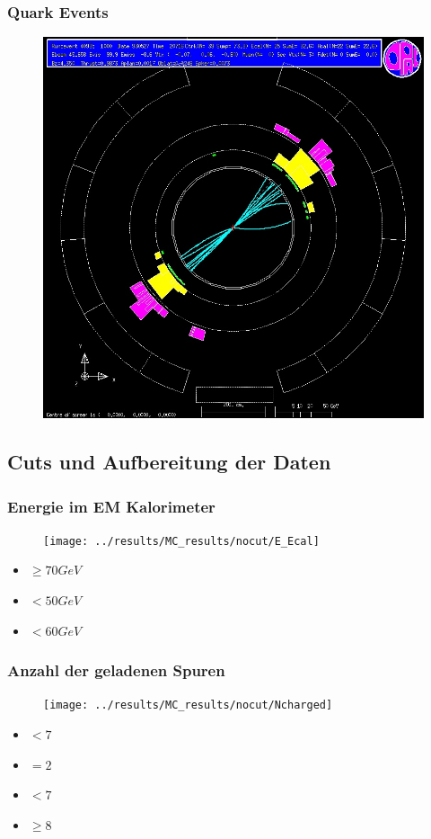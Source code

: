 \begin{frame}
	\frametitle{Quark Events}
	\begin{figure}
		\centering
		\includegraphics[width=0.63\linewidth]{graphics/quarkopal}
	\end{figure}
\end{frame}
\subsection{Cuts und Aufbereitung der Daten}
\begin{frame}
	\frametitle{Energie im EM Kalorimeter}
	\begin{figure}
		\centering
		\texttt{[image: ../results/MC\_results/nocut/E\_Ecal]}
	\end{figure}
	\begin{center}
		\begin{itemize}
			\item {} $\ge 70 \unit{GeV}$
			\item {} $< 50 \unit{GeV}$
			\item {} $< 60 \unit{GeV}$
		\end{itemize}
	\end{center}
\end{frame}

\begin{frame}
	\frametitle{Anzahl der geladenen Spuren}
	\begin{figure}
		\centering
		\texttt{[image: ../results/MC\_results/nocut/Ncharged]}
	\end{figure}
	\begin{center}
		\begin{itemize}
			\item {} $<7$
			\item {} $=2$
			\item {} $<7$
			\item {} $\ge8$
		\end{itemize}
	\end{center}
\end{frame}

